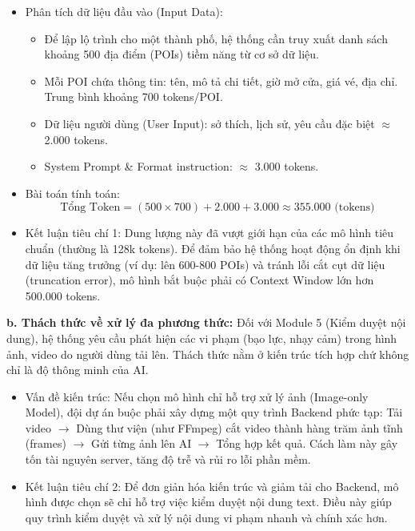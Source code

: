 \begin{itemize}
    \item Phân tích dữ liệu đầu vào (Input Data):
    \begin{itemize}
        \item Để lập lộ trình cho một thành phố, hệ thống cần truy xuất danh sách khoảng 500 địa điểm (POIs) tiềm năng từ cơ sở dữ liệu.
        \item Mỗi POI chứa thông tin: tên, mô tả chi tiết, giờ mở cửa, giá vé, địa chỉ. Trung bình khoảng 700 tokens/POI.
        \item Dữ liệu người dùng (User Input): sở thích, lịch sử, yêu cầu đặc biệt $\approx$ 2.000 tokens.
        \item System Prompt \& Format instruction: $\approx$ 3.000 tokens.
    \end{itemize}
    \item Bài toán tính toán:
    \begin{equation}
    \text{Tổng Token} = (500 \times 700) + 2.000 + 3.000 \approx 355.000 \text{ (tokens)}
    \end{equation}
    \item Kết luận tiêu chí 1: Dung lượng này đã vượt giới hạn của các mô hình tiêu chuẩn (thường là 128k tokens). Để đảm bảo hệ thống hoạt động ổn định khi dữ liệu tăng trưởng (ví dụ: lên 600-800 POIs) và tránh lỗi cắt cụt dữ liệu (truncation error), mô hình bắt buộc phải có Context Window lớn hơn 500.000 tokens.
\end{itemize}

\textbf{b. Thách thức về xử lý đa phương thức:} Đối với Module 5 (Kiểm duyệt nội dung), hệ thống yêu cầu phát hiện các vi phạm (bạo lực, nhạy cảm) trong hình ảnh, video do người dùng tải lên. Thách thức nằm ở kiến trúc tích hợp chứ không chỉ là độ thông minh của AI.
\begin{itemize}
    \item Vấn đề kiến trúc: Nếu chọn mô hình chỉ hỗ trợ xử lý ảnh (Image-only Model), đội dự án buộc phải xây dựng một quy trình Backend phức tạp: Tải video $\rightarrow$ Dùng thư viện (như FFmpeg) cắt video thành hàng trăm ảnh tĩnh (frames) $\rightarrow$ Gửi từng ảnh lên AI $\rightarrow$ Tổng hợp kết quả. Cách làm này gây tốn tài nguyên server, tăng độ trễ và rủi ro lỗi phần mềm.
    \item Kết luận tiêu chí 2: Để đơn giản hóa kiến trúc và giảm tải cho Backend, mô hình được chọn sẽ chỉ hỗ trợ việc kiểm duyệt nội dung text. Điều này giúp quy trình kiểm duyệt và xử lý nội dung vi phạm nhanh và chính xác hơn.
\end{itemize}

